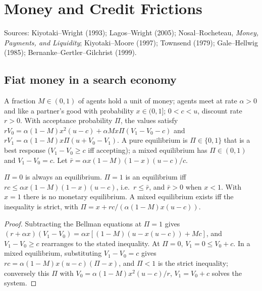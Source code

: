 \chapter{Money and Credit Frictions}
\label{chap:money}

Sources: Kiyotaki--Wright (1993); Lagos--Wright (2005); Nosal--Rocheteau,
\emph{Money, Payments, and Liquidity}; Kiyotaki--Moore (1997); Townsend (1979);
Gale--Hellwig (1985); Bernanke--Gertler--Gilchrist (1999).

\section{Fiat money in a search economy}

\begin{definition}
\label{def:kw}
\leanok
A fraction $M\in(0,1)$ of agents hold a unit of money; agents meet at rate $\alpha>0$ and like a partner's good with
probability $x\in(0,1]$; $0<c<u$, discount rate $r>0$. With acceptance probability $\Pi$, the values satisfy
$rV_0 = \alpha(1-M)x^2(u-c) + \alpha M x\Pi(V_1-V_0-c)$ and $rV_1 = \alpha(1-M)x\Pi(u+V_0-V_1)$.
A pure equilibrium is $\Pi\in\{0,1\}$ that is a best response ($V_1-V_0\ge c$ iff accepting); a mixed equilibrium
has $\Pi\in(0,1)$ and $V_1-V_0=c$. Let $\bar r = \alpha x(1-M)(1-x)(u-c)/c$.
\end{definition}

\begin{theorem}
\label{thm:kw}
\leanok
{}
$\Pi=0$ is always an equilibrium. $\Pi=1$ is an equilibrium iff $rc \le \alpha x(1-M)(1-x)(u-c)$, i.e.\ $r\le\bar r$,
and $\bar r>0$ when $x<1$. With $x=1$ there is no monetary equilibrium. A mixed equilibrium exists iff the inequality
is strict, with $\Pi = x + rc/(\alpha(1-M)x(u-c))$.
\end{theorem}
\begin{proof}
\leanok
Subtracting the Bellman equations at $\Pi=1$ gives $(r+\alpha x)(V_1-V_0) = \alpha x[(1-M)(u-x(u-c))+Mc]$, and
$V_1-V_0\ge c$ rearranges to the stated inequality. At $\Pi=0$, $V_1=0\le V_0+c$. In a mixed equilibrium,
substituting $V_1-V_0=c$ gives $rc = \alpha(1-M)x(u-c)(\Pi-x)$, and $\Pi<1$ is the strict inequality; conversely
this $\Pi$ with $V_0 = \alpha(1-M)x^2(u-c)/r$, $V_1 = V_0+c$ solves the system.
\end{proof}


